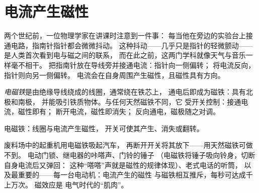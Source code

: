 \section{电流产生磁性}

\begin{example}[指南针泄露了导线的秘密]\label{ex:g8:electric-current-effects:oersted}
两个世纪前，一位物理学家在讲课时注意到一件事：
每当他在旁边的实验台上接通电路，指南针指针都会微微抖动。
这种抖动——几乎只是指针的轻微颤动——
是人类首次看到电与磁之间的联系，
而在此之前，这两门学科就像天气与音乐一样毫不相干。
把指南针放在导线旁并接通电流：指针向一侧偏转；
将电流反向，指针则向另一侧偏转。
电流会在自身周围产生磁性，且磁性具有方向。
\end{example}

\begin{definition}[电磁铁]\label{def:g8:electric-current-effects:electromagnet}
\emph{电磁铁}是由绝缘导线绕成的线圈，通常绕在铁芯上，
通电后即成为磁铁：具有北极和南极，
并能吸引铁质物体。与任何天然磁铁不同，它
受开关控制：接通电流，磁性即有；
断开电流，磁性即消失；
反向通电，磁极随之对调。
\end{definition}

\begin{omfigure}

{\small 电磁铁：线圈与电流产生磁性，
开关可使其产生、消失或翻转。}
\end{omfigure}

\begin{example}[可开关的磁性无处不在]\label{ex:g8:electric-current-effects:uses}
废料场中的起重机用电磁铁吸起汽车，
再断开开关将其放下——用天然磁铁可做不到。
电动门锁、继电器的咔嗒声、门铃的锤子
（电磁铁将锤子吸向铃身，切断自身电流后又弹回：
这种“嗒嗒”声就是磁性的规律体现）、老式电话的听筒，
以及最重要的——每一台电动机：电流产生的磁性
与磁铁相互推斥，每秒可达成千上万次。
磁效应是
电气时代的“肌肉”。
\end{example}

